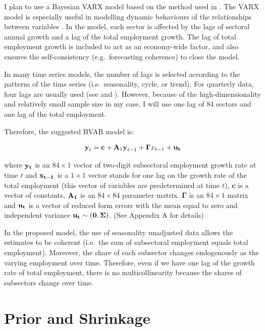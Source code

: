 \documentclass{monashthesis}
\begin{document}
I plan to use a Bayesian VARX model based on the method used in \textcite{anderson2020}. The VARX model is especially useful in modelling dynamic behaviours of the relationships between variables \autocite{warsono2019}. In the model, each sector is affected by the lags of sectoral annual growth and a lag of the total employment growth. The lag of total employment growth is included to act as an economy-wide factor, and also ensures the self-consistency (e.g.~forecasting coherence) to close the model.

In many time series models, the number of lags is selected according to the patterns of the time series (i.e.~seasonality, cycle, or trend). For quarterly data, four lags are usually used (see \textcite{anderson2020} and \textcite{stock2001}). However, because of the high-dimensionality and relatively small sample size in my case, I will use one lag of 84 sectors and one lag of the total employment.

Therefore, the suggested BVAR model is:

\[
\begin{aligned}
\textbf{y}_t=\textbf{c}+\textbf{A}_1 \textbf{y}_{t-1}+\boldsymbol{\Gamma}{x}_{t-1}+\bf{u}_t
\end{aligned}
\]

where \(\bf{y}_t\) is an \(84\times1\) vector of two-digit subsectoral employment growth rate at time \(t\) and \(\bf{x}_{t-1}\) is a \(1\times1\) vector stands for one lag on the growth rate of the total employment (this vector of variables are predetermined at time \(t\)), \(\textbf{c}\) is a vector of constants, \(\bf{A}_{1}\) is an \(84\times84\) parameter matrix. \(\boldsymbol{\Gamma}\) is an \(84\times1\) matrix and \(\bf{u}_t\) is a vector of reduced form errors with the mean equal to zero and independent variance \(\bf{u}_t \sim (0,\boldsymbol{\Sigma})\). (See Appendix A for details)

In the proposed model, the use of seasonality unadjusted data allows the estimates to be coherent (i.e.~the sum of subsectoral employment equals total employment). Moreover, the share of each subsector changes endogenously as the varying employment over time. Therefore, even if we have one lag of the growth rate of total employment, there is no multicollinearity because the shares of subsectors change over time.

\hypertarget{prior-and-shrinkage}{%
\section{Prior and Shrinkage}\label{prior-and-shrinkage}}
\end{document}
